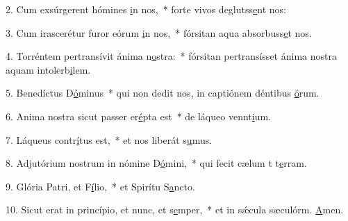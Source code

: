 2. Cum exsúrgerent hómines \uline{i}n nos,~* forte vivos deglutss\uline{e}nt nos:\par 
3. Cum irascerétur furor eórum \uline{i}n nos,~* fórsitan aqua absorbuss\uline{e}t nos.\par 
4. Torréntem pertransívit ánima n\uline{o}stra:~* fórsitan pertransísset ánima nostra aquam intolerb\uline{i}lem.\par 
5. Benedíctus D\uline{ó}minus~* qui non dedit nos, in captiónem déntibus \uline{ó}rum.\par 
6. Anima nostra sicut passer er\uline{é}pta est~* de láqueo vennt\uline{i}um.\par 
7. Láqueus contr\uline{í}tus est,~* et nos liberát s\uline{u}mus.\par 
8. Adjutórium nostrum in nómine D\uline{ó}mini,~* qui fecit cælum t t\uline{e}rram.\par 
9. Glória Patri, et F\uline{í}lio,~* et Spirítu S\uline{a}ncto.\par 
10. Sicut erat in princípio, et nunc, et s\uline{e}mper,~* et in sǽcula sæculórm. \uline{A}men.\par 
